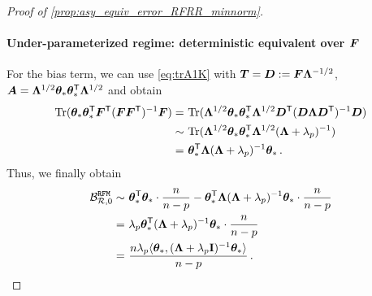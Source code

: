 \begin{proof}[Proof of \cref{prop:asy_equiv_error_RFRR_minnorm}]
\paragraph{Under-parameterized regime: deterministic equivalent over $\bF$}
For the bias term, we can use \cref{eq:trA1K} with $\bT = \bD := \bF \bLambda^{-1/2}$, $\bA=\bLambda^{1/2} \btheta_* \btheta_*^\sT \bLambda^{1/2}$ and obtain
\[
\begin{aligned}
\Tr(\btheta_* \btheta_*^\sT \bF^\sT (\bF \bF^\sT)^{-1} \bF) =&~ \Tr(\bLambda^{1/2} \btheta_* \btheta_*^\sT \bLambda^{1/2} \bD^\sT (\bD \bLambda \bD^\sT)^{-1} \bD )\\
\sim&~ \Tr(\bLambda^{1/2} \btheta_* \btheta_*^\sT \bLambda^{1/2} (\bLambda +\lambda_p)^{-1})\\
=&~ \btheta_*^\sT \bLambda (\bLambda +\lambda_p)^{-1} \btheta_*\,.
\end{aligned}
\]
Thus, we finally obtain
\[
\begin{aligned}
\mathcal{B}^{\tt RFM}_{\mathcal{R},0} \sim&~ \btheta_*^\sT \btheta_* \cdot \frac{n}{n-p} - \btheta_*^\sT \bLambda (\bLambda +\lambda_p)^{-1} \btheta_* \cdot \frac{n}{n-p}\\
=&~ \lambda_p \btheta_*^\sT (\bLambda +\lambda_p)^{-1} \btheta_* \cdot \frac{n}{n-p}\\
=&~ \frac{n\lambda_p \<\btheta_*, (\bLambda +\lambda_p\id)^{-1} \btheta_*\>}{n-p}\,.
\end{aligned}
\]

\end{proof}
